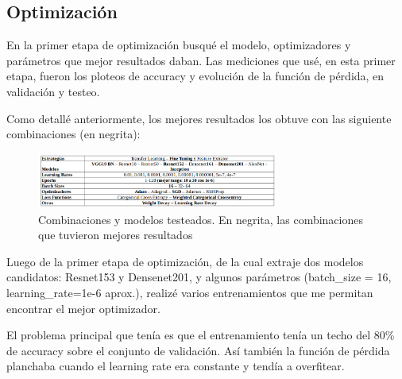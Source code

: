 \documentclass{article}[9pt]
\begin{document}
\subsection{Optimización}

En la primer etapa de optimización busqué el modelo, optimizadores y parámetros que mejor resultados daban. Las mediciones que usé, en esta primer etapa, fueron los ploteos de accuracy y evolución de la función de pérdida, en validación y testeo. 

Como detallé anteriormente, los mejores resultados los obtuve con las siguiente combinaciones (en negrita): 

\begin{figure}[H]
  \centering
    \includegraphics[width=300px]{img/tested.png}
    \caption{Combinaciones y modelos testeados. En negrita, las combinaciones que tuvieron mejores resultados}
    \label{models_bench2}
\end{figure}

Luego de la primer etapa de optimización, de la cual extraje dos modelos candidatos: Resnet153 y Densenet201, y algunos parámetros (batch\_size = 16, learning\_rate=1e-6 aprox.), realizé varios entrenamientos que me permitan encontrar el mejor optimizador.

El problema principal que tenía es que el entrenamiento tenía un techo del 80\% de accuracy sobre el conjunto de validación. Así también la función de pérdida planchaba cuando el learning rate era constante y tendía a overfitear.
\end{document}
